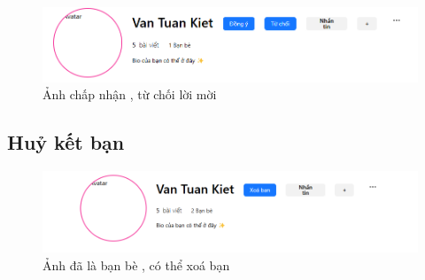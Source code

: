 \FloatBarrier %

\begin{figure}[H]
    \centering
    \includegraphics[width=1\textwidth]{img/instagram/chap_nha_tu_choi.png}
    \caption{Ảnh chấp nhận , từ chối lời mời}
\end{figure}

\FloatBarrier %

\subsection{Huỷ kết bạn}
\begin{figure}[H]
    \centering
    \includegraphics[width=1\textwidth]{img/instagram/xoa_ban.png}
    \caption{Ảnh đã là bạn bè , có thể xoá bạn}
\end{figure}

\FloatBarrier %

